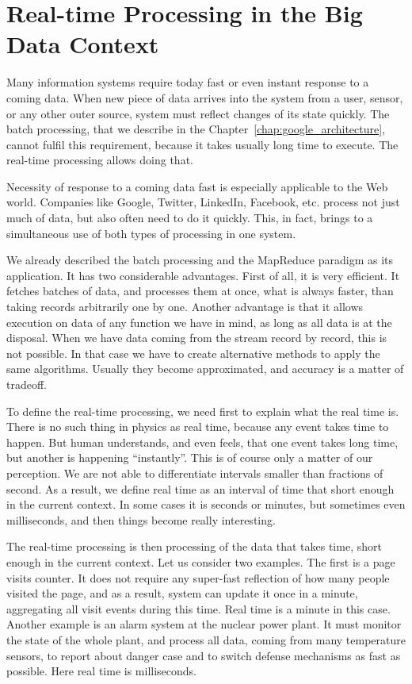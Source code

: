 \chapter{Real-time Processing in the Big Data Context}
\label{chap:real_time_processing}

Many information systems require today fast or even instant response to a coming data.
When new piece of data arrives into the system from a user, sensor, or any other outer source, system must reflect changes of its state quickly. 
The batch processing, that we describe in the Chapter~\ref{chap:google_architecture}, cannot fulfil this requirement, because it takes usually long time to execute.
The real-time processing allows doing that.

Necessity of response to a coming data fast is especially applicable to the Web world.
Companies like Google, Twitter, LinkedIn, Facebook, etc. process not just much of data, but also often need to do it quickly.
This, in fact, brings to a simultaneous use of both types of processing in one system.

We already described the batch processing and the MapReduce paradigm as its application.
It has two considerable advantages.
First of all, it is very efficient.
It fetches batches of data, and processes them at once, what is always faster, than taking records arbitrarily one by one.
Another advantage is that it allows execution on data of any function we have in mind, as long as all data is at the disposal.
When we have data coming from the stream record by record, this is not possible.
In that case we have to create alternative methods to apply the same algorithms.
Usually they become approximated, and accuracy is a matter of tradeoff.

To define the real-time processing, we need first to explain what the real time is.
There is no such thing in physics as real time, because any event takes time to happen.
But human understands, and even feels, that one event takes long time, but another is happening ``instantly''.
This is of course only a matter of our perception.
We are not able to differentiate intervals smaller than fractions of second.
As a result, we define real time as an interval of time that short enough in the current context.
In some cases it is seconds or minutes, but sometimes even milliseconds, and then things become really interesting.

The real-time processing is then processing of the data that takes time, short enough in the current context.
Let us consider two examples.
The first is a page visits counter.
It does not require any super-fast reflection of how many people visited the page, and as a result, system can update it once in a minute, aggregating all visit events during this time.
Real time is a minute in this case.
Another example is an alarm system at the nuclear power plant.
It must monitor the state of the whole plant, and process all data, coming from many temperature sensors, to report about danger case and to switch defense mechanisms as fast as possible.
Here real time is milliseconds.

